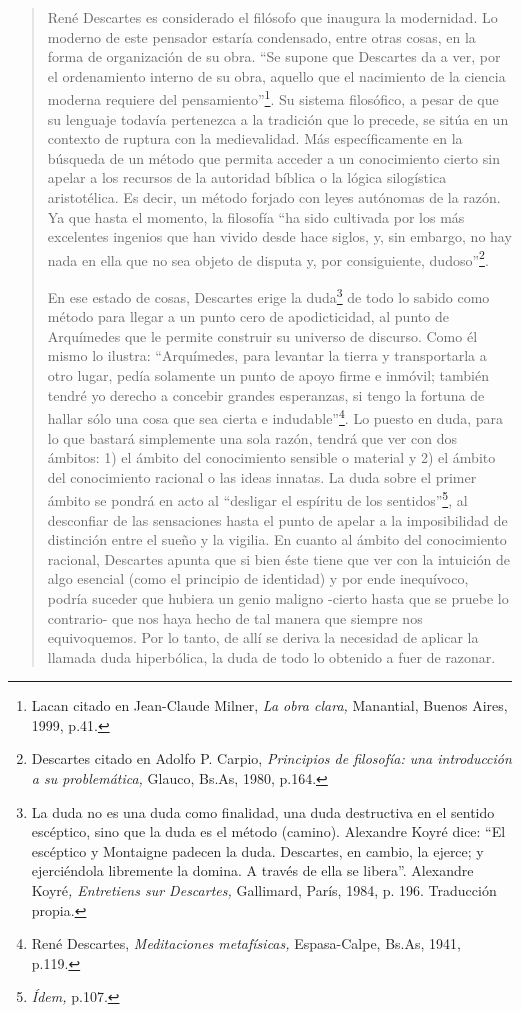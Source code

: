 \begin{quote}
René Descartes es considerado el filósofo que inaugura la modernidad. Lo moderno de este pensador estaría condensado, entre otras cosas, en la forma de organización de su obra. \enquote{Se supone que Descartes da a ver, por el ordenamiento interno de su obra, aquello que el nacimiento de la ciencia moderna requiere del pensamiento}\footnote{Lacan citado en Jean-Claude Milner, \emph{La obra clara,} Manantial, Buenos Aires, 1999, p.41.}. Su sistema filosófico, a pesar de que su lenguaje todavía pertenezca a la tradición que lo precede, se sitúa en un contexto de ruptura con la medievalidad. Más específicamente en la búsqueda de un método que permita acceder a un conocimiento cierto sin apelar a los recursos de la autoridad bíblica o la lógica silogística aristotélica. Es decir, un método forjado con leyes autónomas de la razón. Ya que hasta el momento, la filosofía \enquote{ha sido cultivada por los más excelentes ingenios que han vivido desde hace siglos, y, sin embargo, no hay nada en ella que no sea objeto de disputa y, por consiguiente, dudoso}\footnote{Descartes citado en Adolfo P. Carpio, \emph{Principios de filosofía: una introducción a su problemática,} Glauco, Bs.As, 1980, p.164.}.

En ese estado de cosas, Descartes erige la duda\footnote{La duda no es una duda como finalidad, una duda destructiva en el sentido escéptico, sino que la duda es el método (camino). Alexandre Koyré dice: \enquote{El escéptico y Montaigne padecen la duda. Descartes, en cambio, la ejerce; y ejerciéndola libremente la domina. A través de ella se libera}. Alexandre Koyré\emph{, Entretiens sur Descartes,} Gallimard, París, 1984, p. 196. Traducción propia.} de todo lo sabido como método para llegar a un punto cero de apodicticidad, al punto de Arquímedes que le permite construir su universo de discurso. Como él mismo lo ilustra: \enquote{Arquímedes, para levantar la tierra y transportarla a otro lugar, pedía solamente un punto de apoyo firme e inmóvil; también tendré yo derecho a concebir grandes esperanzas, si tengo la fortuna de hallar sólo una cosa que sea cierta e indudable}\footnote{René Descartes, \emph{Meditaciones metafísicas,} Espasa-Calpe, Bs.As, 1941, p.119.}. Lo puesto en duda, para lo que bastará simplemente una sola razón, tendrá que ver con dos ámbitos: 1) el ámbito del conocimiento sensible o material y 2) el ámbito del conocimiento racional o las ideas innatas. La duda sobre el primer ámbito se pondrá en acto al \enquote{desligar el espíritu de los sentidos}\footnote{\emph{Ídem,} p.107.}, al desconfiar de las sensaciones hasta el punto de apelar a la imposibilidad de distinción entre el sueño y la vigilia. En cuanto al ámbito del conocimiento racional, Descartes apunta que si bien éste tiene que ver con la intuición de algo esencial (como el principio de identidad) y por ende inequívoco, podría suceder que hubiera un genio maligno -cierto hasta que se pruebe lo contrario- que nos haya hecho de tal manera que siempre nos equivoquemos. Por lo tanto, de allí se deriva la necesidad de aplicar la llamada duda hiperbólica, la duda de todo lo obtenido a fuer de razonar.


\end{quote}
